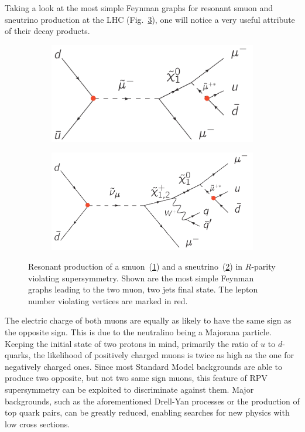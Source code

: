 Taking a look at the most simple Feynman graphs for resonant smuon and sneutrino production at the LHC (Fig.~\ref{fig:resosmusneu}), one will notice a very useful attribute of their decay products.

\begin{figure}[ht!]
  \centering
  \begin{subfigure}[b]{0.495\textwidth}
    \centering
    \includegraphics[width=\textwidth]{plots/rpv-resonant-smuon-samesign-mumuqq.pdf}
    \caption{\label{fig:ressmu}}
  \end{subfigure}
  \begin{subfigure}[b]{0.495\textwidth}
    \centering
    \includegraphics[width=\textwidth]{plots/rpv-resonant-sneutrino-chargino-mumuqq.pdf}
    \caption{\label{fig:ressneu}}
  \end{subfigure}
  \caption{Resonant production of a smuon~(\ref{fig:ressmu}) and a sneutrino~(\ref{fig:ressneu}) in $R$-parity violating supersymmetry. Shown are the most simple Feynman graphs leading to the two muon, two jets final state. The lepton number violating vertices are marked in red.}
  \label{fig:resosmusneu}
\end{figure}

\noindent The electric charge of both muons are equally as likely to have the same sign as the opposite sign. This is due to the neutralino being a Majorana particle. Keeping the initial state of two protons in mind, primarily the ratio of $u$ to $d$-quarks, the likelihood of positively charged muons is twice as high as the one for negatively charged ones. Since most Standard Model backgrounds are able to produce two opposite, but not two same sign muons, this feature of RPV supersymmetry can be exploited to discriminate against them. Major backgrounds, such as the aforementioned Drell-Yan processes or the production of top quark pairs, can be greatly reduced, enabling searches for new physics with low cross sections.


